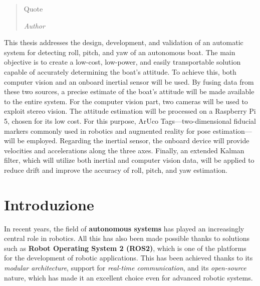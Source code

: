 \documentclass[a4paper,12pt,twoside,openright]{book}
\newenvironment{abstract}{\cleardoublepage \null \vfill \begin{center}\bfseries\abstractname \end{center}}{\vfill\null}
\begin{document}
\begin{quote}
  Quote

  \textit{Author}
\end{quote}
\vfill
\null


\begingroup %
  \makeatletter
  \let\ps@plain\ps@empty
  \makeatother
  \tableofcontents
\endgroup

\begin{abstract} %
\markboth{}{} %
\thispagestyle{empty}
This thesis addresses the design, development, and validation of an automatic system for detecting roll, pitch, and yaw of an autonomous boat. The main objective is to create a low-cost, low-power, and easily transportable solution capable of accurately determining the boat’s attitude. To achieve this, both computer vision and an onboard inertial sensor will be used. By fusing data from these two sources, a precise estimate of the boat’s attitude will be made available to the entire system. For the computer vision part, two cameras will be used to exploit stereo vision. The attitude estimation will be processed on a Raspberry Pi 5, chosen for its low cost. For this purpose, ArUco Tags—two-dimensional fiducial markers commonly used in robotics and augmented reality for pose estimation—will be employed. Regarding the inertial sensor, the onboard device will provide velocities and accelerations along the three axes. Finally, an extended Kalman filter, which will utilize both inertial and computer vision data, will be applied to reduce drift and improve the accuracy of roll, pitch, and yaw estimation.
\end{abstract}



\mainmatter\doublespace 

\chapter*{Introduzione} %
\thispagestyle{empty}
In recent years, the field of \textbf{autonomous systems} has played an increasingly central role in robotics. All this has also been made possible thanks to solutions such as \textbf{Robot Operating System 2 (ROS2)}, which is one of the platforms for the development of robotic applications. This has been achieved thanks to its \textit{modular architecture}, support for \textit{real-time communication}, and its \textit{open-source} nature, which has made it an excellent choice even for advanced robotic systems.  
\end{document}
